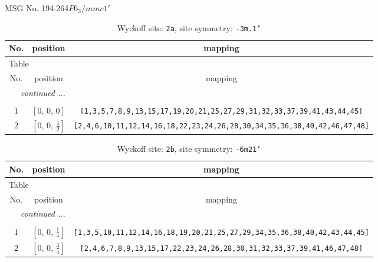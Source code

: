 \documentclass[fleqn,8pt]{jsarticle}
\begin{document}
\setcounter{MaxMatrixCols}{32}

\renewcommand{\tablename}{Table~}
\renewcommand{\figurename}{Figure~}
\begin{center}
\LARGE
MSG No. 194.264\quad$P6_{3}/mmc1'$
\end{center}
\renewcommand{\arraystretch}{1.2}
\begin{longtable}{ccc}
\caption{Wyckoff site: {\tt 2a}, site symmetry: {\tt -3m.1'}}
 \\
 \hline \hline
No. & position & mapping \\ \hline \endfirsthead

\multicolumn{2}{l}{\tablename\ \thetable{}} \\
 \hline \hline
No. & position & mapping \\ \hline \endhead

 \hline \hline
\multicolumn{2}{r}{\footnotesize\it continued ...} \\ \endfoot

 \hline \hline
\multicolumn{2}{r}{} \\ \endlastfoot

1 & $\left[ 0,\, 0,\, 0 \right]$ & {\tt [1,3,5,7,8,9,13,15,17,19,20,21,25,27,29,31,32,33,37,39,41,43,44,45]} \\ \hline
2 & $\left[ 0,\, 0,\, \frac{1}{2} \right]$ & {\tt [2,4,6,10,11,12,14,16,18,22,23,24,26,28,30,34,35,36,38,40,42,46,47,48]} \\
\end{longtable}
\renewcommand{\arraystretch}{1.2}
\begin{longtable}{ccc}
\caption{Wyckoff site: {\tt 2b}, site symmetry: {\tt -6m21'}}
 \\
 \hline \hline
No. & position & mapping \\ \hline \endfirsthead

\multicolumn{2}{l}{\tablename\ \thetable{}} \\
 \hline \hline
No. & position & mapping \\ \hline \endhead

 \hline \hline
\multicolumn{2}{r}{\footnotesize\it continued ...} \\ \endfoot

 \hline \hline
\multicolumn{2}{r}{} \\ \endlastfoot

1 & $\left[ 0,\, 0,\, \frac{1}{4} \right]$ & {\tt [1,3,5,10,11,12,14,16,18,19,20,21,25,27,29,34,35,36,38,40,42,43,44,45]} \\ \hline
2 & $\left[ 0,\, 0,\, \frac{3}{4} \right]$ & {\tt [2,4,6,7,8,9,13,15,17,22,23,24,26,28,30,31,32,33,37,39,41,46,47,48]} \\
\end{longtable}
\end{document}
